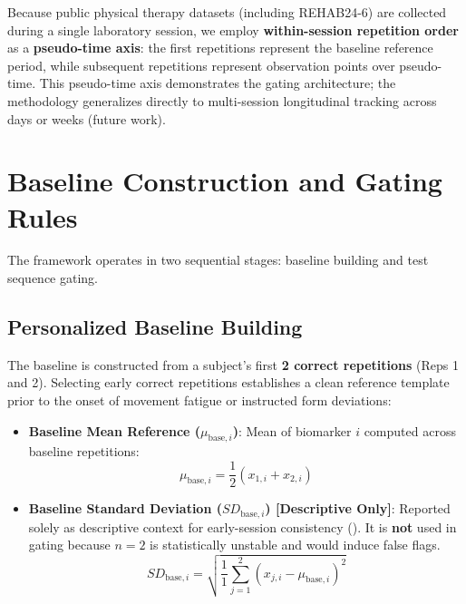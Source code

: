 Because public physical therapy datasets (including REHAB24-6) are collected during a single laboratory session, we employ \textbf{within-session repetition order} as a \textbf{pseudo-time axis}: the first repetitions represent the baseline reference period, while subsequent repetitions represent observation points over pseudo-time. This pseudo-time axis demonstrates the gating architecture; the methodology generalizes directly to multi-session longitudinal tracking across days or weeks (future work).



\section{Baseline Construction and Gating Rules}
\label{sec:9-2-baseline-construction-and-gating-rules}


The framework operates in two sequential stages: baseline building and test sequence gating.

\subsection{Personalized Baseline Building}
\label{sec:9-2-1-personalized-baseline-building}

The baseline is constructed from a subject's first \textbf{2 correct repetitions} (Reps 1 and 2). Selecting early correct repetitions establishes a clean reference template prior to the onset of movement fatigue or instructed form deviations:
\begin{itemize}
  \item \textbf{Baseline Mean Reference ($\mu_{\text{base}, i}$)}: Mean of biomarker $i$ computed across baseline repetitions:
\begin{equation}
  \mu_{\text{base}, i} = \frac{1}{2} (x_{1, i} + x_{2, i})
  \label{eq:disp1}
\end{equation}
  \item \textbf{Baseline Standard Deviation ($SD_{\text{base}, i}$) [Descriptive Only]}: Reported solely as descriptive context for early-session consistency (). It is \textbf{not} used in gating because $n = 2$ is statistically unstable and would induce false flags.
\begin{equation}
  SD_{\text{base}, i} = \sqrt{\frac{1}{1} \sum_{j=1}^2 (x_{j, i} - \mu_{\text{base}, i})^2}
  \label{eq:auto2}
\end{equation}
\end{itemize}

